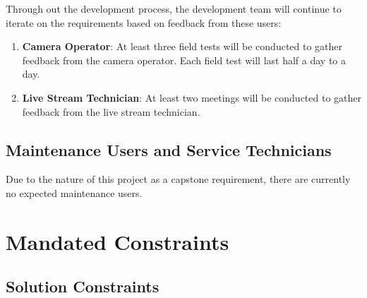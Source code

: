 \documentclass[12pt]{article}
\begin{document}
Through out the development process, the development team will continue to
iterate on the requirements based on feedback from these users:

\begin{enumerate}
  \item \textbf{Camera Operator}: At least three field tests will be conducted
        to gather feedback from the camera operator. Each field test will last
        half a day to a day.
  \item \textbf{Live Stream Technician}: At least two meetings will be conducted
        to gather feedback from the live stream technician.
\end{enumerate}

\subsection{Maintenance Users and Service Technicians}

Due to the nature of this project as a capstone requirement, there are
currently no expected maintenance users.

\section{Mandated Constraints}
\subsection{Solution Constraints}
\end{document}
